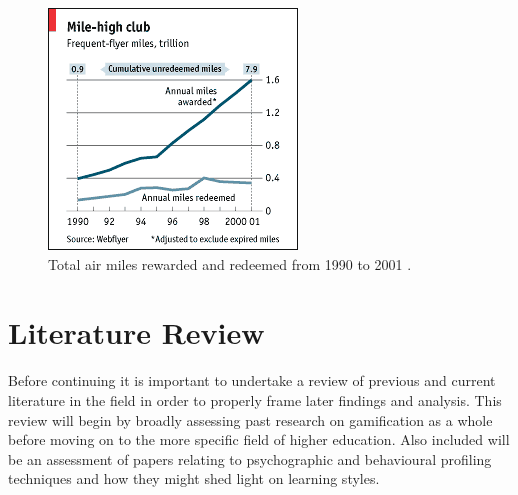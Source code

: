 \documentclass[12pt,a4paper,twoside]{report}
\begin{document}
\begin{figure}
\begin{center}
	\includegraphics{../img/flyer.png}
	\caption{Total air miles rewarded and redeemed from 1990 to 2001 \cite{freq-fly}.}
	\label{freq-flyer}
\end{center}
\end{figure}

\chapter{Literature Review}
\label{sec:lit}
Before continuing it is important to undertake a review of previous and current literature in the field in order to properly frame later findings and analysis. This review will begin by broadly assessing past research on gamification as a whole before moving on to the more specific field of higher education. Also included will be an assessment of papers relating to psychographic and behavioural profiling techniques and how they might shed light on learning styles.
\end{document}
